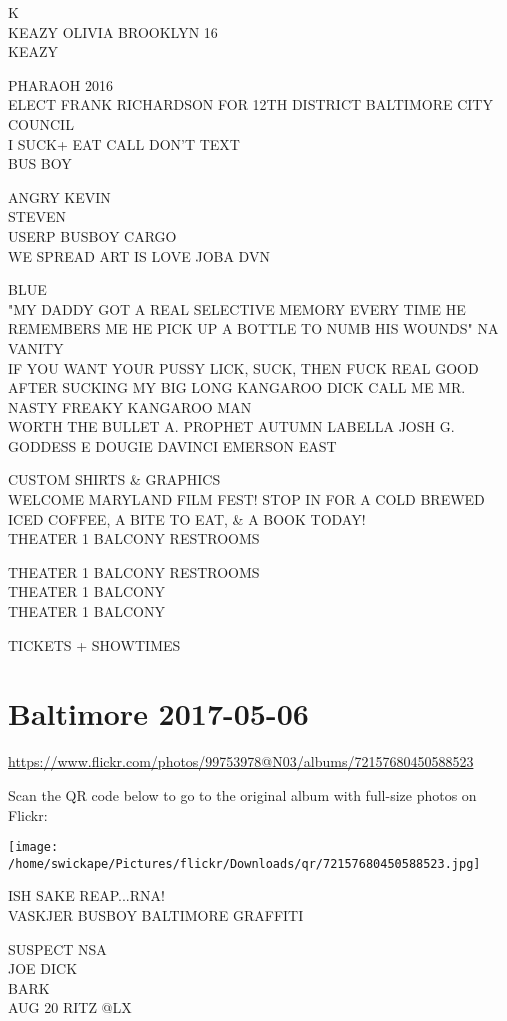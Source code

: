 \documentclass[10pt,letterpaper]{article}
\begin{document}
K\\
KEAZY OLIVIA BROOKLYN 16\\
KEAZY

PHARAOH 2016\\
ELECT FRANK RICHARDSON FOR 12TH DISTRICT BALTIMORE CITY COUNCIL\\
I SUCK+ EAT CALL DON'T TEXT\\
BUS BOY

ANGRY KEVIN\\
STEVEN\\
USERP BUSBOY CARGO\\
WE SPREAD ART IS LOVE JOBA DVN

BLUE\\
"MY DADDY GOT A REAL SELECTIVE MEMORY EVERY TIME HE REMEMBERS ME HE PICK UP A BOTTLE TO NUMB HIS WOUNDS" NA VANITY\\
IF YOU WANT YOUR PUSSY LICK, SUCK, THEN FUCK REAL GOOD AFTER SUCKING MY BIG LONG KANGAROO DICK CALL ME MR. NASTY FREAKY KANGAROO MAN\\
WORTH THE BULLET A. PROPHET AUTUMN LABELLA JOSH G. GODDESS E DOUGIE DAVINCI EMERSON EAST

CUSTOM SHIRTS \& GRAPHICS\\
WELCOME MARYLAND FILM FEST!  STOP IN FOR A COLD BREWED ICED COFFEE, A BITE TO EAT, \& A BOOK TODAY!\\
THEATER 1 BALCONY RESTROOMS

THEATER 1 BALCONY RESTROOMS\\
THEATER 1 BALCONY\\
THEATER 1 BALCONY

TICKETS + SHOWTIMES
\pagebreak

\section*{Baltimore 2017-05-06}

\url{https://www.flickr.com/photos/99753978@N03/albums/72157680450588523}

Scan the QR code below to go to the original album with full-size photos on Flickr:

\texttt{[image: /home/swickape/Pictures/flickr/Downloads/qr/72157680450588523.jpg]}
\pagebreak

ISH SAKE REAP...RNA!\\
VASKJER BUSBOY BALTIMORE GRAFFITI

SUSPECT NSA\\
JOE DICK\\
BARK\\
AUG 20 RITZ @LX
\end{document}
